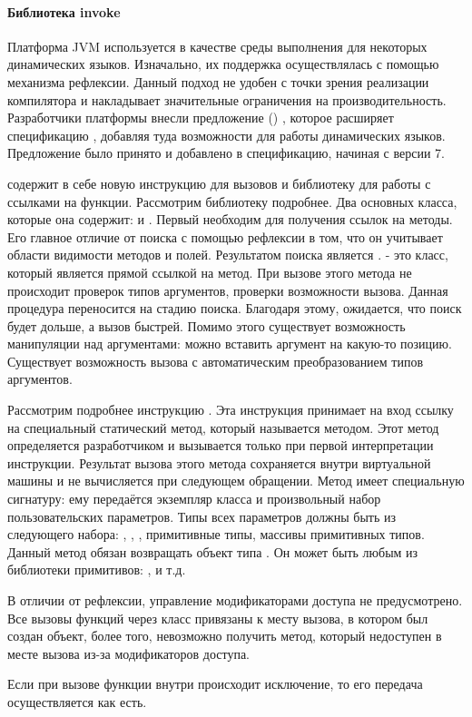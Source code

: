 \paragraph{Библиотека invoke}
  Платформа JVM используется в качестве среды выполнения для некоторых динамических языков. Изначально, их поддержка осуществлялась с помощью механизма рефлексии. Данный подход не удобен с точки зрения реализации компилятора и накладывает значительные ограничения на производительность. Разработчики платформы внесли предложение () , которое расширяет спецификацию , добавляя туда возможности для работы динамических языков\cite{jvm:jsr292}. Предложение было принято и добавлено в спецификацию, начиная с версии 7.

 содержит в себе новую инструкцию для вызовов  и библиотеку для работы с ссылками на функции. Рассмотрим библиотеку подробнее. Два основных класса, которые она содержит:  и . Первый необходим для получения ссылок на методы. Его главное отличие от поиска с помощью рефлексии в том, что он учитывает области видимости методов и полей. Результатом поиска является .  - это класс, который является прямой ссылкой на метод. При вызове этого метода не происходит проверок типов аргументов, проверки возможности вызова. Данная процедура переносится на стадию поиска. Благодаря этому, ожидается, что поиск будет дольше, а вызов быстрей. Помимо этого существует возможность манипуляции над аргументами: можно вставить аргумент на какую-то позицию. Существует возможность вызова с автоматическим преобразованием типов аргументов.

Рассмотрим подробнее инструкцию . Эта инструкция принимает на вход ссылку на специальный статический метод, который называется  методом. Этот метод определяется разработчиком и вызывается только при первой интерпретации инструкции. Результат вызова этого метода сохраняется внутри виртуальной машины и не вычисляется при следующем обращении. Метод имеет специальную сигнатуру: ему передаётся экземпляр класса  и произвольный набор пользовательских параметров. Типы всех параметров должны быть из следующего набора: , , , примитивные типы, массивы примитивных типов. Данный метод обязан возвращать объект типа . Он может быть любым  из библиотеки примитивов: ,  и т.д.

В отличии от рефлексии, управление модификаторами доступа не предусмотрено. Все вызовы функций через класс  привязаны к месту вызова, в котором был создан  объект, более того, невозможно получить метод, который недоступен в месте вызова из-за модификаторов доступа.

Если при вызове функции внутри происходит исключение, то его передача осуществляется как есть.
